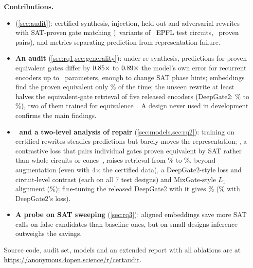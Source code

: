 \noindent\textbf{Contributions.}
\begin{itemize}
\item \textbf{\audit} (\cref{sec:audit}): certified synthesis, injection, held-out and adversarial rewrites with
SAT-proven gate matching (\NTotalVar\ variants of \NTestCones\ EPFL test circuits, \NTestPairsK\ proven pairs), and
metrics separating prediction from representation failure.
\item \textbf{An audit} (\cref{sec:rq1,sec:generality}): under re-synthesis, predictions for proven-equivalent
gates differ by $0.85\times$ to $0.89\times$ the model's own error for recurrent encoders up to
\ScMaxParams\ parameters, enough to change SAT phase
hints; embeddings find the proven equivalent only \BaseTopRS\% of the time; the unseen
rewrite at least halves the equivalent-gate retrieval of five released encoders (DeepGate2: \DTwoTopSeen\% to
\DTwoHTwoRS\%), two of them trained for equivalence~\cite{DBLP:journals/tcad/WangBHZXHHY25,DBLP:conf/dac/ZhengZZX26}. A design never used in development confirms
the main findings.
\item \textbf{\ours\ and a two-level analysis of repair} (\cref{sec:models,sec:rq2}): training on certified rewrites
steadies predictions but barely moves the representation; \ours, a contrastive loss that pairs individual gates proven equivalent by SAT rather than whole circuits or
cones~\cite{DBLP:conf/dac/WangBHZXHYH22,DBLP:conf/aspdac/FangLZX25,DBLP:conf/nips/ZhengLSX25}, raises
retrieval from \BaseTopRS\% to \OursTopRS\%, beyond augmentation (even with 4$\times$ the certified data), a
DeepGate2-style loss and circuit-level contrast (each on all 7 test designs) and MixGate-style $L_1$
alignment (\LoneTop\%); fine-tuning the released DeepGate2 with
it gives \FtEqTopSeen\% (\FtCtrlTopSeen\% with DeepGate2's loss).
\item \textbf{A probe on SAT sweeping} (\cref{sec:rq3}): aligned embeddings save more SAT calls on false
candidates than baseline ones, but on small designs inference outweighs the savings.
\end{itemize}
Source code, audit set, models and an extended report with all ablations are at {\color{linkblue}\url{https://anonymous.4open.science/r/certaudit}}.

